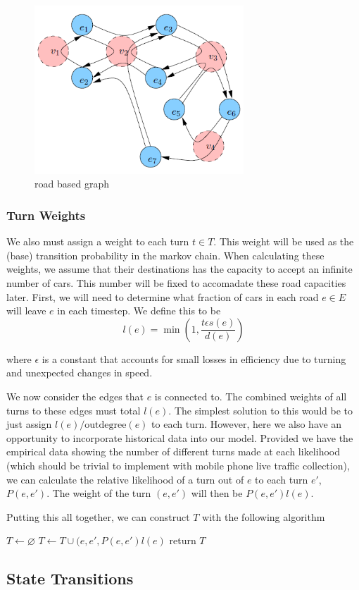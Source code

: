 \documentclass[a4paper]{article}
\newcommand\ddfrac[2]{\frac{\displaystyle #1}{\displaystyle #2}}
\begin{document}
\begin{figure}[h]
    \centering
    \includegraphics[width=0.7\textwidth]{road.PNG}
    \caption{road based graph}
    \label{fig:roa}
\end{figure}

\subsubsection{Turn Weights}
We also must assign a weight to each turn $t \in T$. 
This weight will be used as the (base) transition probability in the markov chain. 
When calculating these weights, we assume that their destinations has the capacity to accept an infinite number of cars. 
This number will be fixed to accomadate these road capacities later.
First, we will need to determine what fraction of cars in each road $e \in E$ will leave $e$ in each timestep. 
We define this to be
$$
l(e) = \min \left(1, \ddfrac{t \epsilon s(e)}{d(e)} \right)
$$

where $\epsilon$ is a constant that accounts for small losses in efficiency due to turning and unexpected changes in speed.

We now consider the edges that $e$ is connected to. The combined weights of all turns to these edges must total $l(e)$.
The simplest solution to this would be to just assign $l(e)/\mathrm{outdegree}(e)$ to each turn.
However, here we also have an opportunity to incorporate historical data into our model.
Provided we have the empirical data showing the number of different turns made at each likelihood 
(which should be trivial to implement with mobile phone live traffic collection), we can calculate the relative likelihood of a turn out of $e$ to each turn $e'$, $P(e, e')$.
The weight of the turn $(e, e')$ will then be $P(e, e') l(e)$.

Putting this all together, we can construct $T$ with the following algorithm
\begin{algorithmic}[1]
		\State $T \gets \varnothing$
					\State $T \gets T \cup {(e, e', P(e, e') l(e)}$
				\EndFor
			\EndFor
		\EndFor
		\State return $T$
	\EndFunction
\end{algorithmic}

\subsection{State Transitions}

\printbibliography
\end{document}
